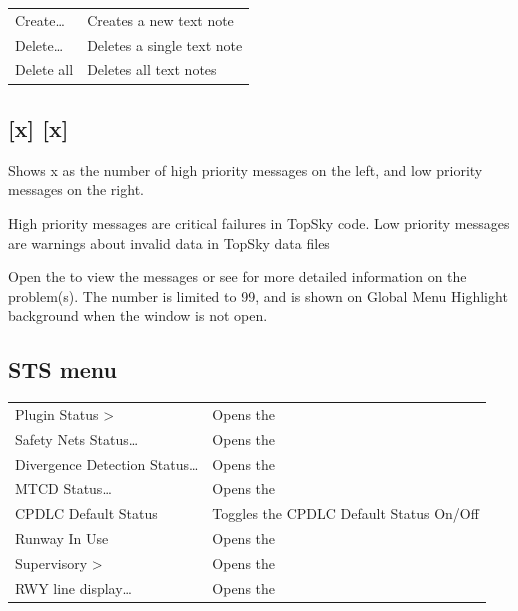 \documentclass[a4paper,oneside,11pt]{memoir}
\newcommand{\colorref}[1]{\colorbox{Flight Highlight}{\color{#1}#1}}
\newcommand{\winref}[1]{\textit{\titleref{#1}}}
\begin{document}
\begin{longtable}{p{5cm} p{7.5cm}}
  Create…     & Creates a new text note\\
  Delete…     & Deletes a single text note\\
  Delete all  & Deletes all text notes\\
\end{longtable}

\subsection{[x] [x]}
\label{menu:pqmm}

Shows x as the number of high priority messages on the left, and low priority messages on the right. 

\bigskip

High priority messages are critical failures in TopSky code. Low priority messages are warnings about invalid data in TopSky data files

\bigskip

Open the \winref{win:pqw} to view the messages or see \winref{menu:status} for more detailed information on the problem(s). The number is limited to 99, and is shown on \colorref{Global Menu Highlight} background when the window is not open.
 
\subsection{STS menu}
\label{menu:sts}

\begin{tabular}{p{5cm} p{7.5cm}}
Plugin Status >                & Opens the \winref{menu:status}\\
Safety Nets Status…            & Opens the \winref{win:snsw}\\
Divergence Detection Status…   & Opens the \winref{win:ddsw}\\
MTCD Status…                   & Opens the \winref{win:mtcdsw}\\
CPDLC Default Status           & Toggles the CPDLC Default Status On/Off\\
Runway In Use                  & Opens the \winref{menu:ad}\\
Supervisory >                  & Opens the \winref{menu:super}\\
RWY line display…              & Opens the \winref{menu:ad}\\
\end{tabular}
\medskip
\end{document}
